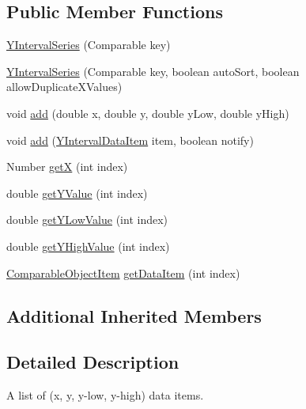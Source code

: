 \subsection*{Public Member Functions}
\begin{DoxyCompactItemize}
\item 
\mbox{\hyperlink{classorg_1_1jfree_1_1data_1_1xy_1_1_y_interval_series_a7f10d1fd04a70b32bc26fd3dc1c0d299}{Y\+Interval\+Series}} (Comparable key)
\item 
\mbox{\hyperlink{classorg_1_1jfree_1_1data_1_1xy_1_1_y_interval_series_abe2bb7bd9b4279a570eed708be039bfa}{Y\+Interval\+Series}} (Comparable key, boolean auto\+Sort, boolean allow\+Duplicate\+X\+Values)
\item 
void \mbox{\hyperlink{classorg_1_1jfree_1_1data_1_1xy_1_1_y_interval_series_a58fe103daddb2c0f3b7119f0327c5387}{add}} (double x, double y, double y\+Low, double y\+High)
\item 
void \mbox{\hyperlink{classorg_1_1jfree_1_1data_1_1xy_1_1_y_interval_series_a479b67332a6208aec5eb9dc3ed2d2076}{add}} (\mbox{\hyperlink{classorg_1_1jfree_1_1data_1_1xy_1_1_y_interval_data_item}{Y\+Interval\+Data\+Item}} item, boolean notify)
\item 
Number \mbox{\hyperlink{classorg_1_1jfree_1_1data_1_1xy_1_1_y_interval_series_ab999562afef626087c19a8751bc047e0}{getX}} (int index)
\item 
double \mbox{\hyperlink{classorg_1_1jfree_1_1data_1_1xy_1_1_y_interval_series_a883639c512416c2e570062999e403158}{get\+Y\+Value}} (int index)
\item 
double \mbox{\hyperlink{classorg_1_1jfree_1_1data_1_1xy_1_1_y_interval_series_a39443307d90610019eb56eb6def9ea7a}{get\+Y\+Low\+Value}} (int index)
\item 
double \mbox{\hyperlink{classorg_1_1jfree_1_1data_1_1xy_1_1_y_interval_series_a9523b2dc9b01f9bcecc264cf5926f5b9}{get\+Y\+High\+Value}} (int index)
\item 
\mbox{\hyperlink{classorg_1_1jfree_1_1data_1_1_comparable_object_item}{Comparable\+Object\+Item}} \mbox{\hyperlink{classorg_1_1jfree_1_1data_1_1xy_1_1_y_interval_series_a80e9c60fb723427342aed634b281a574}{get\+Data\+Item}} (int index)
\end{DoxyCompactItemize}
\subsection*{Additional Inherited Members}


\subsection{Detailed Description}
A list of (x, y, y-\/low, y-\/high) data items.

